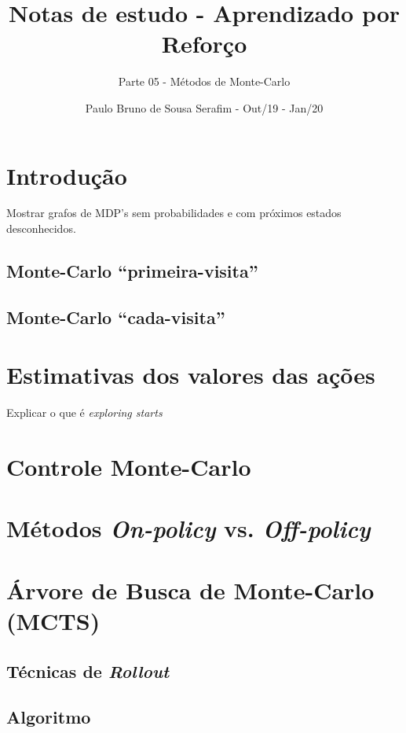 \documentclass{article}
\title{Notas de estudo - Aprendizado por Reforço}
\author{Parte 05 - Métodos de Monte-Carlo}
\date{Paulo Bruno de Sousa Serafim - Out/19 - Jan/20}
\begin{document}
\maketitle

    \section{Introdução}
    
        Mostrar grafos de MDP's sem probabilidades e com próximos estados desconhecidos.
        
        \subsection{Monte-Carlo ``primeira-visita''}
        
        \subsection{Monte-Carlo ``cada-visita''}
    
    \section{Estimativas dos valores das ações}
    
        Explicar o que é \textit{exploring starts}
    
    \section{Controle Monte-Carlo}
    
    \section{Métodos \textit{On-policy} vs. \textit{Off-policy}}
    
    \section{Árvore de Busca de Monte-Carlo (MCTS)}
    
        \subsection{Técnicas de \textit{Rollout}}
        
        \subsection{Algoritmo}
\end{document}
